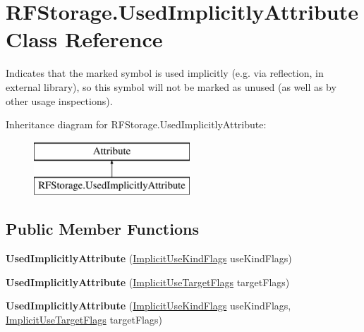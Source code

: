 \hypertarget{class_r_f_storage_1_1_used_implicitly_attribute}{}\section{R\+F\+Storage.\+Used\+Implicitly\+Attribute Class Reference}
\label{class_r_f_storage_1_1_used_implicitly_attribute}


Indicates that the marked symbol is used implicitly (e.\+g. via reflection, in external library), so this symbol will not be marked as unused (as well as by other usage inspections).  


Inheritance diagram for R\+F\+Storage.\+Used\+Implicitly\+Attribute\+:\begin{figure}[H]
\begin{center}
\leavevmode
\includegraphics[height=2.000000cm]{class_r_f_storage_1_1_used_implicitly_attribute}
\end{center}
\end{figure}
\subsection*{Public Member Functions}
\begin{DoxyCompactItemize}
\item 
\mbox{\label{class_r_f_storage_1_1_used_implicitly_attribute_a6efad3c8e882b3fbbba3d2fa6f7f88bc}} 
{\bfseries Used\+Implicitly\+Attribute} (\mbox{\hyperlink{namespace_r_f_storage_a858608c6c632849e1730c5fafed9fa25}{Implicit\+Use\+Kind\+Flags}} use\+Kind\+Flags)
\item 
\mbox{\label{class_r_f_storage_1_1_used_implicitly_attribute_a27b4b4f36f871f373d00c5da68dbf60e}} 
{\bfseries Used\+Implicitly\+Attribute} (\mbox{\hyperlink{namespace_r_f_storage_a11267cbdad6c26a08cf6b5c281d2f67b}{Implicit\+Use\+Target\+Flags}} target\+Flags)
\item 
\mbox{\label{class_r_f_storage_1_1_used_implicitly_attribute_a1f4ad1db9234ffe7382bdde09de102c2}} 
{\bfseries Used\+Implicitly\+Attribute} (\mbox{\hyperlink{namespace_r_f_storage_a858608c6c632849e1730c5fafed9fa25}{Implicit\+Use\+Kind\+Flags}} use\+Kind\+Flags, \mbox{\hyperlink{namespace_r_f_storage_a11267cbdad6c26a08cf6b5c281d2f67b}{Implicit\+Use\+Target\+Flags}} target\+Flags)
\end{DoxyCompactItemize}
